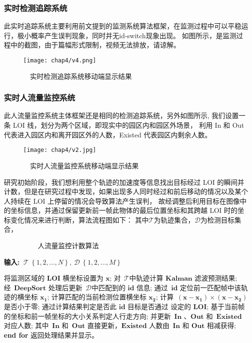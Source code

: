 \subsubsection{实时检测追踪系统}
此实时追踪系统主要利用前文提到的监测系统算法框架，在监测过程中可以平稳运行，极小概率产生误判现象，同时并无id-switch现象出现。
如图所示，是监测过程中的截图，由于篇幅形式限制，视频无法排放，请谅解。 

\begin{figure}[htpb]
	\centering
	\texttt{[image: chap4/v4.png]}
	\caption{\ \ 实时检测追踪系统移动端显示结果}
	\label{fig4-12}
\end{figure}

\subsubsection{实时人流量监控系统}
此人流量监控系统主体框架还是相同的检测追踪系统，另外如图所示,
我们设置一条 LOI 线，划分为两个区域，即现实中的园区内和园区外场景，
利用 In 和 Out 代表进入园区内和离开园区外的人数，Existed 代表园区内剩余人数。 

\begin{figure}[htpb]
	\centering
	\texttt{[image: chap4/v2.jpg]}
	\caption{\ \ 实时人流量监控系统移动端显示结果}
	\label{fig4-13}
\end{figure}

研究初始阶段，我们想利用整个轨迹的加速度等信息找出目标经过 LOI 的瞬间并计数，但是在研究过程中发现，如果出现多人同时经过和前后移动的情况以及某个人持续在 LOI 上停留的情况会导致算法产生误判，
故经调整后利用目标在图像中的坐标信息，并通过保留更新前一帧此物体的最后位置坐标和其跨越 LOI 时的坐标变化情况来进行判断，算法流程图如下：
其中$\mathcal{T}$为轨迹集合，$\mathcal{D}$为检测目标集合，
\begin{algorithm}[htpb]
	\caption{\ \ \ \ \ \ \ \ \ \ 人流量监控计数算法}
	\fangsong
	\hspace*{0.02in} {\bf 输入:\ $\mathcal{T}\ \left\{1, 2, ..., N \right\},\ \mathcal{D}\ \left\{1, 2, ..., M \right\}$ }
	\begin{algorithmic}[1]
		\State 将监测区域的 $\bm{LOI}$ 横坐标设置为 $\bm{x}$;
		\State 对\ {\bf $\mathcal{T}$}中轨迹计算 $\bm{Kalman}$ 滤波预测结果;
		\State 经\ $\bm{DeepSort}$ 处理后更新\ {\bf $\mathcal{D}$}中匹配到的 $\bm{id}$ 信息;
		\State 通过\ $\bm{id}$ 定位前一匹配帧中该轨迹的横坐标 $\bm{x_1}$;
		\State 计算匹配的当前检测位置横坐标 $\bm{x_2}$;
		\State 计算\ $ \left(\bm{x} - \bm{x_1}\right) \times \left(\bm{x} - \bm{x_2}\right) $ 是否小于零;
		\State 通过计算结果判定是否此 $\bm{id}$ 目标是否通过 设定的 $\bm{LOI}$;
		\State 基于当前帧的坐标和前一帧坐标的大小关系判定人行走方向;
		\State 并更新\ $\bm{In}$ 、$\bm{Out}$ 和\ $\bm{Existed}$ 对应人数;
		\State 其中\ $\bm{In}$ 和\ $\bm{Out}$ 直接更新，$\bm{Existed}$ 人数由\ $\bm{In}$ 和 $\bm{Out}$ 相减获得;
		\EndFor
		\State \textbf{end for}
		\State 返回处理结果并显示。
	\end{algorithmic}
	\label{algo3}
\end{algorithm}


